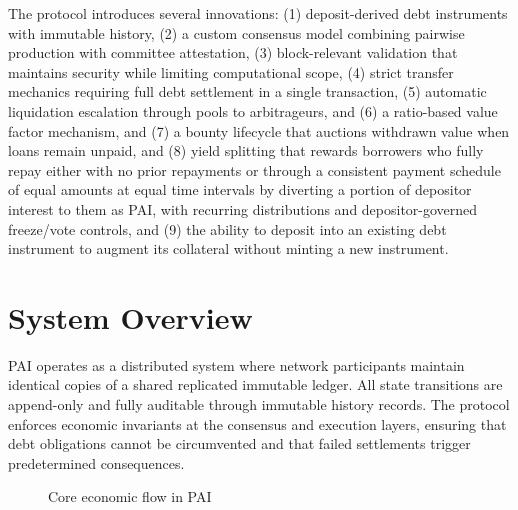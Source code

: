 \documentclass[11pt,a4paper]{article}
\begin{document}
The protocol introduces several innovations: (1) deposit-derived debt instruments with immutable history, (2) a custom consensus model combining pairwise production with committee attestation, (3) block-relevant validation that maintains security while limiting computational scope, (4) strict transfer mechanics requiring full debt settlement in a single transaction, (5) automatic liquidation escalation through pools to arbitrageurs, and (6) a ratio-based value factor mechanism, and (7) a bounty lifecycle that auctions withdrawn value when loans remain unpaid, and (8) yield splitting that rewards borrowers who fully repay either with no prior repayments or through a consistent payment schedule of equal amounts at equal time intervals by diverting a portion of depositor interest to them as PAI, with recurring distributions and depositor-governed freeze/vote controls, and (9) the ability to deposit into an existing debt instrument to augment its collateral without minting a new instrument.

\section{System Overview}
PAI operates as a distributed system where network participants maintain identical copies of a shared replicated immutable ledger. All state transitions are append-only and fully auditable through immutable history records. The protocol enforces economic invariants at the consensus and execution layers, ensuring that debt obligations cannot be circumvented and that failed settlements trigger predetermined consequences.

\begin{figure}[H]
\centering
{}
\caption{Core economic flow in PAI}
\label{fig:coreflow}
\end{figure}
\end{document}
